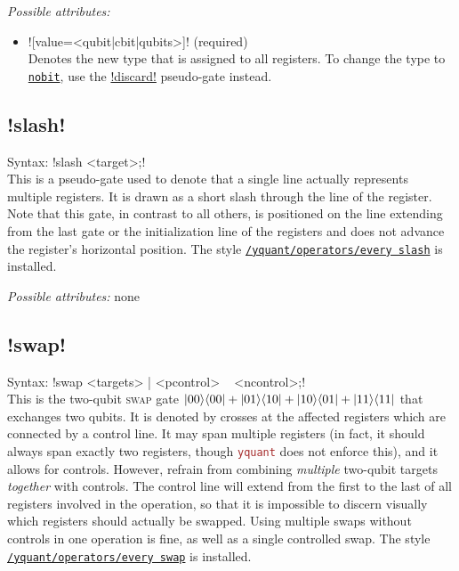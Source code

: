\documentclass{scrartcl}
\def\pkg#1{\textcolor{brown}{\texttt{#1}}}
\def\gate#1{\hyperref[gate:#1]{\texttt{#1}}}
\def\style#1{\hyperref[style:#1]{\texttt{#1}}}
\def\Yquant{\pkg{yquant}}
\def\ketbra#1#2{\ket{#1}\!\bra{#2}}
\begin{document}
         \emph{Possible attributes:}
         \begin{itemize}
            \item \yquant![value=<qubit|cbit|qubits>]! (required) \\
               Denotes the new type that is assigned to all registers.
               To change the type to \gate{nobit}, use the \hyperref[gate:discard]{\yquant!discard!} pseudo\hyp gate instead.
         \end{itemize}
      
      \subsection{\texorpdfstring{\yquant!slash!}{slash}}\label{gate:slash}
         Syntax: \yquant!slash <target>;! \\
         This is a pseudo\hyp gate used to denote that a single line actually represents multiple registers.
         It is drawn as a short slash through the line of the register.
         Note that this gate, in contrast to all others, is positioned on the line extending from the last gate or the initialization line of the registers and does not advance the register's horizontal position.
         The style \style{/yquant/operators/every slash} is installed.
         
         \emph{Possible attributes:} none
      
      \subsection{\texorpdfstring{\yquant!swap!}{swap}}\label{gate:swap}
         Syntax: \yquant!swap <targets> | <pcontrol> ~ <ncontrol>;! \\
         This is the two\hyp qubit \textsc{swap} gate $\ketbra{00}{00} + \ketbra{01}{10} + \ketbra{10}{01} + \ketbra{11}{11}$ that exchanges two qubits.
         It is denoted by crosses at the affected registers which are connected by a control line.
         It may span multiple registers (in fact, it should always span exactly two registers, though \Yquant{} does not enforce this), and it allows for controls.
         However, refrain from combining \emph{multiple} two\hyp qubit targets \emph{together} with controls.
         The control line will extend from the first to the last of all registers involved in the operation, so that it is impossible to discern visually which registers should actually be swapped.
         Using multiple swaps without controls in one operation is fine, as well as a single controlled swap.
         The style \style{/yquant/operators/every swap} is installed.
         
\end{document}
